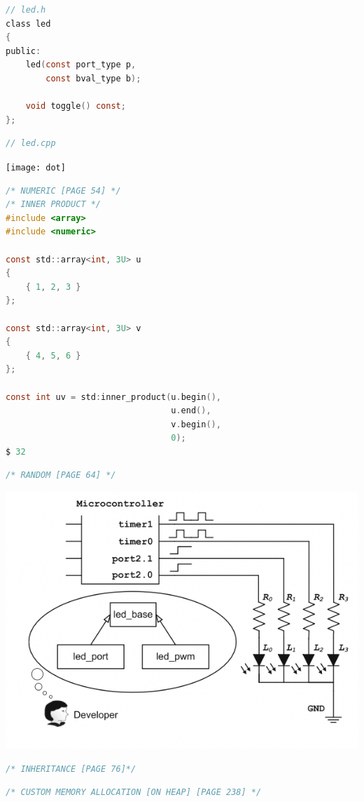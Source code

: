 \documentclass[8pt]{extarticle}
\begin{document}
\begin{small}
\begin{multicols}{2}
\begin{lstlisting}[language=C]
// led.h
class led
{
public:
	led(const port_type p,
		const bval_type b);
	
	void toggle() const;
};	
\end{lstlisting}
\begin{lstlisting}[language=C]
// led.cpp
\end{lstlisting}

\texttt{[image: dot]}
\begin{lstlisting}[language=C]
/* NUMERIC [PAGE 54] */	
/* INNER PRODUCT */
#include <array>
#include <numeric>

const std::array<int, 3U> u
{
	{ 1, 2, 3 }
};

const std::array<int, 3U> v
{
	{ 4, 5, 6 }
};

const int uv = std:inner_product(u.begin(),
								 u.end(),
								 v.begin(),
								 0);
$ 32


\end{lstlisting}

\begin{lstlisting}[language=C]
/* RANDOM [PAGE 64] */	
\end{lstlisting}


\includegraphics[scale=0.5]{oo_mcontroller}

\begin{lstlisting}[language=C]
/* INHERITANCE [PAGE 76]*/
\end{lstlisting}

\begin{lstlisting}[language=C]
/* CUSTOM MEMORY ALLOCATION [ON HEAP] [PAGE 238] */


\end{lstlisting}
\end{multicols}
\end{small}
\end{document}
